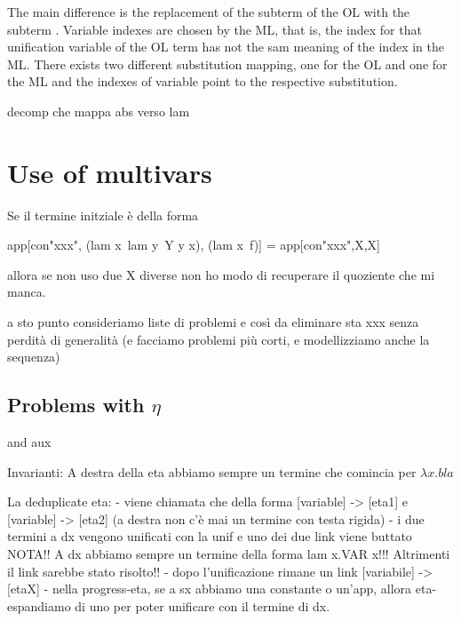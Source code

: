 \documentclass[sigconf,natbib=false,review]{acmart}
\begin{document}
\noindent
The main difference is the replacement of the subterm  of
the OL with the subterm . Variable indexes are chosen by the
ML, that is, the index  for that unification variable of the OL term
has not the sam meaning of the index  in the ML. There exists two
different substitution mapping, one for the OL and one for the ML and the indexes
of variable point to the respective substitution.

decomp che mappa abs verso lam
\noindent
{}

\section{Use of multivars}

Se il termine initziale è della forma

\begin{elpicode}
  app[con"xxx", (lam x\ lam y\ Y y x), (lam x\ f)]
  =
  app[con"xxx",X,X]
\end{elpicode}

allora se non uso due X diverse non ho modo di recuperare il quoziente che mi manca.

a sto punto consideriamo liste di problemi e così da eliminare sta xxx senza
perdità di generalità (e facciamo problemi più corti, e modellizziamo anche la
sequenza)

\subsection{Problems with $\eta$}



and aux




Invarianti:
A destra della eta abbiamo sempre un termine che comincia per $\lambda x. bla$

\begin{textcode}
  La deduplicate eta:
  - viene chiamata che della forma [variable] -> [eta1] e [variable] -> [eta2] 
    (a destra non c'è mai un termine con testa rigida)
  - i due termini a dx vengono unificati con la unif e uno dei due link viene buttato
    NOTA!! A dx abbiamo sempre un termine della forma lam x.VAR x!!!
    Altrimenti il link sarebbe stato risolto!!
  - dopo l'unificazione rimane un link [variabile] -> [etaX] 
  - nella progress-eta, se a sx abbiamo una constante o un'app, allora eta-espandiamo
    di uno per poter unificare con il termine di dx.
\end{textcode}
  
\end{document}
